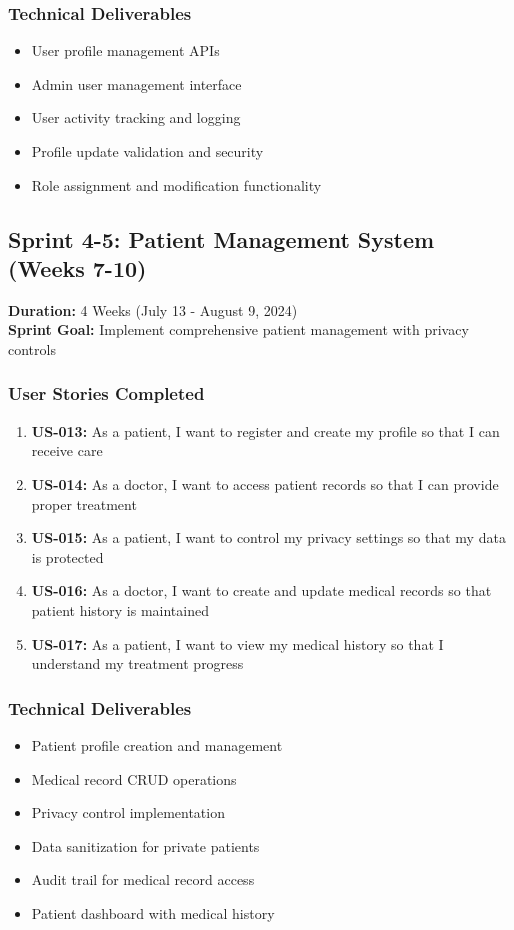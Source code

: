 \documentclass[12pt,a4paper]{article}
\begin{document}
\subsubsection{Technical Deliverables}
\begin{itemize}
    \item User profile management APIs
    \item Admin user management interface
    \item User activity tracking and logging
    \item Profile update validation and security
    \item Role assignment and modification functionality
\end{itemize}

\subsection{Sprint 4-5: Patient Management System (Weeks 7-10)}
\textbf{Duration:} 4 Weeks (July 13 - August 9, 2024) \\
\textbf{Sprint Goal:} Implement comprehensive patient management with privacy controls

\subsubsection{User Stories Completed}
\begin{enumerate}
    \item \textbf{US-013:} As a patient, I want to register and create my profile so that I can receive care
    \item \textbf{US-014:} As a doctor, I want to access patient records so that I can provide proper treatment
    \item \textbf{US-015:} As a patient, I want to control my privacy settings so that my data is protected
    \item \textbf{US-016:} As a doctor, I want to create and update medical records so that patient history is maintained
    \item \textbf{US-017:} As a patient, I want to view my medical history so that I understand my treatment progress
\end{enumerate}

\subsubsection{Technical Deliverables}
\begin{itemize}
    \item Patient profile creation and management
    \item Medical record CRUD operations
    \item Privacy control implementation
    \item Data sanitization for private patients
    \item Audit trail for medical record access
    \item Patient dashboard with medical history
\end{itemize}
\end{document}
